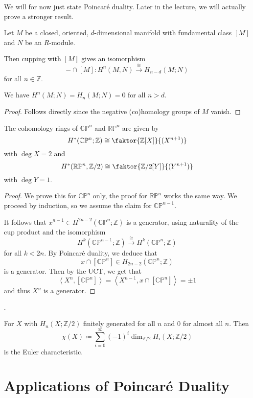 We will for now just state Poincaré duality.
Later in the lecture, we will actually prove a stronger result.

\begin{theorem}
  \label{thm:poincare-duality}
  Let $M$ be a closed, oriented, $d$-di\-men\-sion\-al manifold 
  with fundamental class $[M]$ and  $N$ be an  $R$-module.

  Then cupping with $[M]$ gives an isomorphism
   \[
     - \cap [M] \colon   H^n(M,N) \xrightarrow{\cong} H_{n-d}(M;N)
  \]
  for all $n\in \mathbb{Z}$.
\end{theorem}

\begin{corollary}
  We have $H^n(M;N) = H_n(M;N) = 0$ for all $n>d$.
\end{corollary}
\begin{proof}
  Follows directly since the negative (co)homology groups of $M$
  vanish.
\end{proof}

\begin{corollary}
  The cohomology rings of $\mathbb{C}\mathbb{P}^n$ and $\mathbb{R}\mathbb{P}^n$
  are given by
  \[
    H^*(\mathbb{C}\mathbb{P}^n;\mathbb{Z})
    \cong
    \faktor{\mathbb{Z}[X]}{(X^{n+1})}
  \]
  with $\deg X = 2$ and
  \[
    H^*(\mathbb{R}\mathbb{P}^n, \mathbb{Z}/2)
    \cong
    \faktor{\mathbb{Z}/2[Y]}{(Y^{n+1})}
  \]
  with $\deg Y = 1$.
\end{corollary}

\begin{proof}
  We prove this for $\mathbb{C}\mathbb{P}^n$ only,
  the proof for $\mathbb{R}\mathbb{P}^n$ works the same way.
  We proceed by induction, so we assume the claim for $\mathbb{C}\mathbb{P}^{n-1}$.

  It follows that $x^{n-1} \in H^{2n-2}(\mathbb{C}\mathbb{P}^n ;\mathbb{Z})$ 
  is a generator, using naturality of the cup product and the
  isomorphism
  \[
    H^k(\mathbb{C}\mathbb{P}^{n-1};\mathbb{Z})
    \xrightarrow{\cong}
    H^k(\mathbb{C}\mathbb{P}^n;\mathbb{Z})
  \] 
  for all $k<2n$. 
  By Poincaré duality, we deduce that
  \[
    x \cap [\mathbb{C}\mathbb{P}^n] \in H_{2n-2}(\mathbb{C}\mathbb{P}^n;\mathbb{Z})
  \]
  is a generator.
  Then by the UCT, we get that
  \[
    \left< X^n, [\mathbb{C}\mathbb{P}^n] \right>
    =
    \left< X^{n-1}, x \cap [\mathbb{C}\mathbb{P}^n] \right>
    =
    \pm 1
  \]
  and thus $X^n$ is a generator.
\end{proof}

.

\begin{definition}
  For $X$ with $H_n(X;\mathbb{Z}/2)$ finitely generated for all $n$
  and  $0$ for almost all $n$.
  Then
   \[
    \chi(X) \coloneqq \sum_{i=0}^{\infty} (-1)^i \dim_{\mathbb{Z}/2} H_i(X;\mathbb{Z}/2)
  \]
  is the Euler characteristic.
\end{definition}


\section{Applications of Poincaré Duality}
